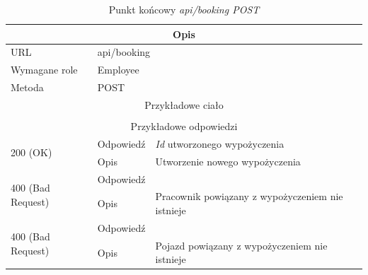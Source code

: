 \documentclass[eng,printmode,openany]{mgr}
\begin{document}
\begin{table}[H]
	\caption{Punkt końcowy \textit{api/booking POST}}
	\begin{tabularx}{\textwidth}{|l|l|X|}
		\hline
		\multicolumn{3}{|c|}{Opis}                         						\\ \hline
		URL                       & \multicolumn{2}{l|}{api/booking} 	    \\ \hline
		Wymagane role             & \multicolumn{2}{l|}{Employee} \\ \hline
		Metoda                    & \multicolumn{2}{l|}{POST} 					\\ \hline
		\multicolumn{3}{|c|}{Przykładowe ciało}         						\\ \hline
		\multicolumn{3}{|c|}{} 		        \\ \hline
		\multicolumn{3}{|c|}{ Przykładowe odpowiedzi}                   		                        \\ \hline
		\multirow{2}{*}{200 (OK)} 			& Odpowiedź     &  \textit{Id} utworzonego wypożyczenia     \\ \cline{2-3} 
		& Opis         	& Utworzenie nowego wypożyczenia     						\\ \hline
		\multirow{2}{*}{400 (Bad Request)} 	& Odpowiedź     &    \\ \cline{2-3} 
		& Opis          & Pracownik powiązany z wypożyczeniem nie istnieje      						    \\ \hline
		\multirow{2}{*}{400 (Bad Request)} 	& Odpowiedź     &    \\ \cline{2-3} 
		& Opis          & Pojazd powiązany z wypożyczeniem nie istnieje      								\\ \hline                                                                
	\end{tabularx}
\end{table}
\end{document}
